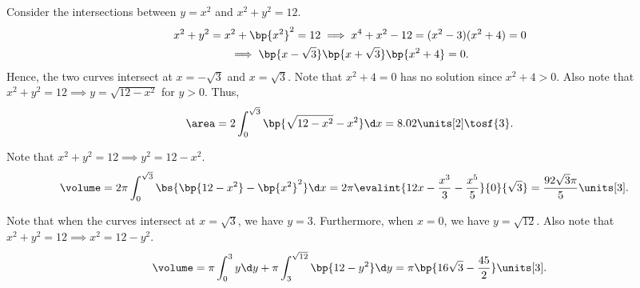 \begin{solution}
    \begin{ppart}
        Consider the intersections between $y = x^2$ and $x^2 + y^2 = 12$.
        \begin{gather*}
            x^2 + y^2 = x^2 + \bp{x^2}^2 = 12 \implies x^4 + x^2 - 12 = (x^2 - 3)(x^2 + 4) = 0 \\
            \implies \bp{x - \sqrt3}\bp{x+\sqrt3}\bp{x^2 + 4} = 0.
        \end{gather*}
        Hence, the two curves intersect at $x = -\sqrt3$ and $x = \sqrt3$. Note that $x^2 + 4 = 0$ has no solution since $x^2 + 4 > 0$. Also note that $x^2 + y^2 = 12 \implies y = \sqrt{12 - x^2}$ for $y > 0$. Thus, \[\area = 2\int_0^{\sqrt3} \bp{\sqrt{12-x^2} - x^2} \d x = 8.02 \units[2] \tosf{3}.\]
    \end{ppart}
    \begin{ppart}
        Note that $x^2 + y^2 = 12 \implies y^2 = 12 - x^2$.
        \begin{align*}
            \volume &= 2\pi\int_0^{\sqrt3} \bs{\bp{12 - x^2} - \bp{x^2}^2} \d x = 2\pi \evalint{12x - \frac{x^3}3- \frac{x^5}5}{0}{\sqrt3} = \frac{92\sqrt{3}\pi}5 \units[3].
        \end{align*}
    \end{ppart}
    \begin{ppart}
        Note that when the curves intersect at $x = \sqrt{3}$, we have $y = 3$. Furthermore, when $x = 0$, we have $y = \sqrt{12}$. Also note that $x^2 + y^2 = 12 \implies x^2 = 12 - y^2$. \[\volume = \pi\int_0^{3} y \d y + \pi \int_{3}^{\sqrt{12}} \bp{12 - y^2} \d y = \pi\bp{16\sqrt{3} - \frac{45}2} \units[3].\]
    \end{ppart}
\end{solution}

